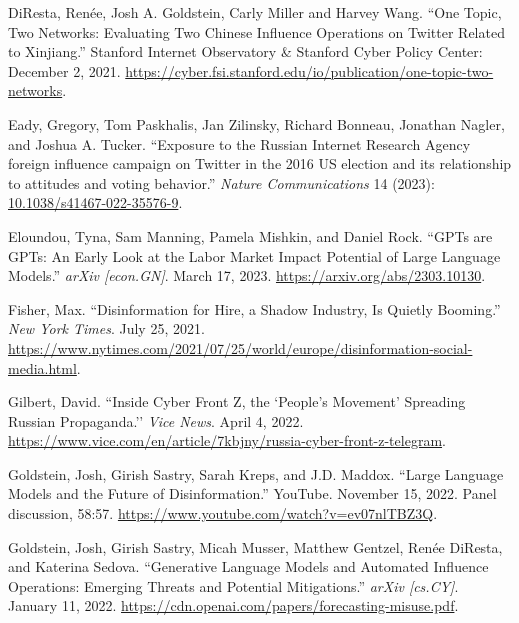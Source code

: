 \documentclass{article}
\begin{document}
\begin{thebibliography}{9}
  DiResta, Renée, Josh A. Goldstein, Carly Miller and Harvey Wang. ``One Topic, Two Networks: Evaluating Two Chinese Influence Operations on Twitter Related to Xinjiang.'' Stanford Internet Observatory \& Stanford Cyber Policy Center: December 2, 2021. \href{https://cyber.fsi.stanford.edu/io/publication/one-topic-two-networks}{https://cyber.fsi.stanford.edu/io/publication/one-topic-two-networks}.

  Eady, Gregory, Tom Paskhalis, Jan Zilinsky, Richard Bonneau, Jonathan Nagler, and Joshua A. Tucker. ``Exposure to the Russian Internet Research Agency foreign influence campaign on Twitter in the 2016 US election and its relationship to attitudes and voting behavior.'' \textit{Nature Communications} 14 (2023): \href{https://www.nature.com/articles/s41467-022-35576-9}{10.1038/s41467-022-35576-9}.

  Eloundou, Tyna, Sam Manning, Pamela Mishkin, and Daniel Rock. ``GPTs are GPTs: An Early Look at the Labor Market Impact Potential of Large Language Models.'' \textit{arXiv [econ.GN]}. March 17, 2023. \href{https://arxiv.org/abs/2303.10130}{https://arxiv.org/abs/2303.10130}.

  Fisher, Max. ``Disinformation for Hire, a Shadow Industry, Is Quietly Booming.'' \textit{New York Times}. July 25, 2021. \href{https://www.nytimes.com/2021/07/25/world/europe/disinformation-social-media.html}{https://www.nytimes.com/2021/07/25/world/europe/disinformation-social-media.html}. 

  Gilbert, David. ``Inside Cyber Front Z, the `People's Movement’ Spreading Russian Propaganda.'' \textit{Vice News}. April 4, 2022. \href{https://www.vice.com/en/article/7kbjny/russia-cyber-front-z-telegram}{https://www.vice.com/en/article/7kbjny/russia-cyber-front-z-telegram}.

  Goldstein, Josh, Girish Sastry, Sarah Kreps, and J.D. Maddox. ``Large Language Models and the Future of Disinformation.'' YouTube. November 15, 2022. Panel discussion, 58:57. \href{https://www.youtube.com/watch?v=ev07nlTBZ3Q}{https://www.youtube.com/watch?v=ev07nlTBZ3Q}.

  Goldstein, Josh, Girish Sastry, Micah Musser, Matthew Gentzel, Renée DiResta, and Katerina Sedova. ``Generative Language Models and Automated Influence Operations: Emerging Threats and Potential Mitigations.'' \textit{arXiv [cs.CY]}. January 11, 2022. \href{https://cdn.openai.com/papers/forecasting-misuse.pdf}{https://cdn.openai.com/papers/forecasting-misuse.pdf}.


\end{thebibliography}
\end{document}
